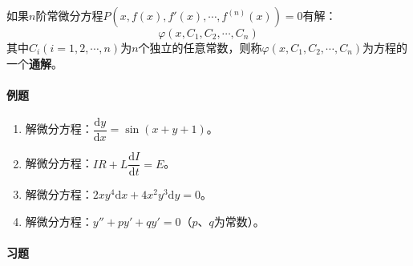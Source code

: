 \documentclass[fontset=none,openany,a4paper]{ctexbook}
\begin{document}
如果$n$阶常微分方程$P(x,f(x),f'(x),\cdots,f^{(n)}(x))=0$有解：
\[
\varphi(x, C_1, C_2, \cdots, C_n)
\]
其中$C_i(i=1,2,\cdots,n)$为$n$个独立的任意常数，则称$\varphi(x,C_1,C_2,\cdots,C_n)$为方程的一个\textbf{通解}。


\paragraph{例题}

\begin{enumerate}

    \item 解微分方程：$\dfrac{\mathrm{d}y}{\mathrm{d}x}=\sin(x+y+1)$。

    \item 解微分方程：$IR+L\dfrac{\mathrm{d}I}{\mathrm{d}t}=E$。

    \item 解微分方程：$2xy^4\mathrm{d}x+4x^2y^3\mathrm{d}y=0$。

    \item 解微分方程：$y''+py'+qy'=0$（$p$、$q$为常数）。

\end{enumerate}

\paragraph{习题}
\end{document}
